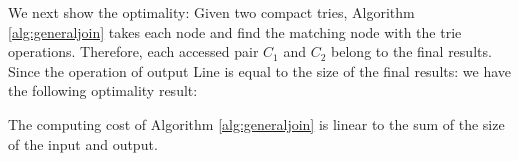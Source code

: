 \smallskip
\smallskip

We next show the optimality: Given two compact tries, Algorithm \ref{alg:generaljoin} takes each node and find the  matching node with the trie operations. Therefore, each accessed pair $C_1$ and $C_2$ belong to the final results. Since the operation of output Line is equal to the size of the final results: we have the following optimality result:

\begin{theorem}   The computing cost of Algorithm \ref{alg:generaljoin} is linear to the sum of the size of the input and output.
\end{theorem}




